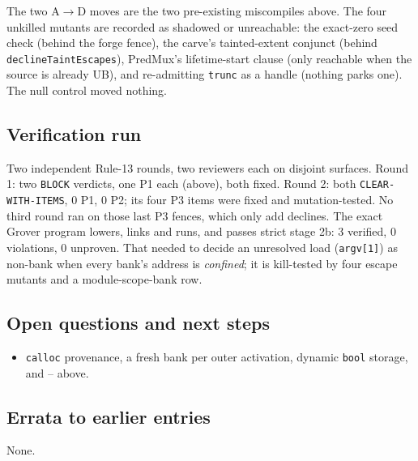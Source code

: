 The two A$\to$D moves are the two pre-existing miscompiles above. The four
unkilled mutants are recorded as shadowed or unreachable: the exact-zero seed
check (behind the forge fence), the carve's tainted-extent conjunct (behind
\texttt{declineTaintEscapes}), PredMux's lifetime-start clause (only reachable
when the source is already UB), and re-admitting \texttt{trunc} as a handle
(nothing parks one). The null control moved nothing.

\subsection*{Verification run}
Two independent Rule-13 rounds, two reviewers each on disjoint surfaces.
Round 1: two \texttt{BLOCK} verdicts, one P1 each (above), both fixed. Round 2:
both \texttt{CLEAR-WITH-ITEMS}, 0 P1, 0 P2; its four P3 items were fixed and
mutation-tested. No third round ran on those last P3 fences, which only add
declines. The exact Grover program lowers, links and runs, and passes strict
stage 2b: 3 verified, 0 violations, 0 unproven. That needed
 to decide an unresolved load
(\texttt{argv[1]}) as non-bank when every bank's address is \emph{confined};
it is kill-tested by four escape mutants and a module-scope-bank row.

\subsection*{Open questions and next steps}
\begin{itemize}
  \item {} \texttt{calloc} provenance,  a fresh bank per
    outer activation,  dynamic \texttt{bool} storage, and
    -- above.
\end{itemize}

\subsection*{Errata to earlier entries}
None.
